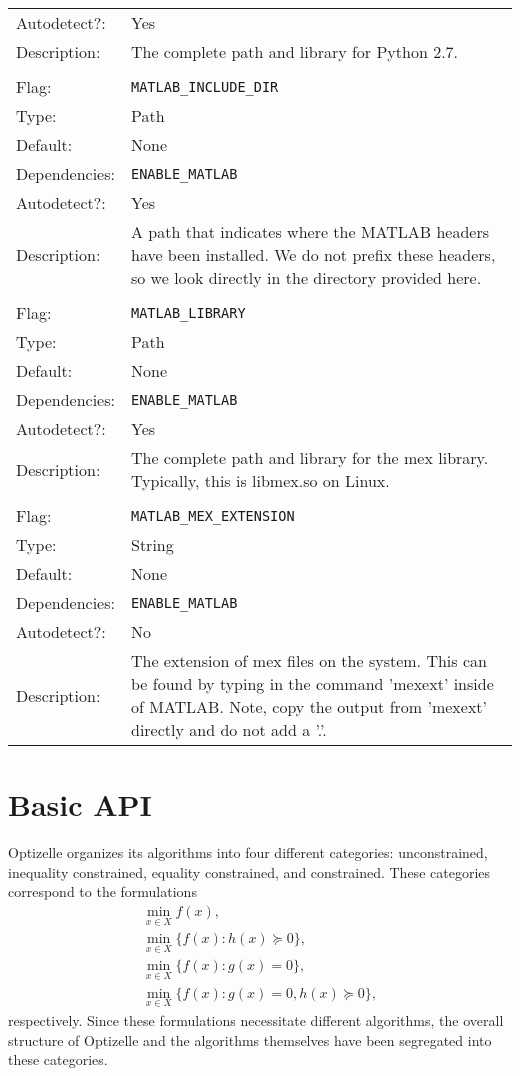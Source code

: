 \documentclass{report}
\begin{document}
\begin{center}
\begin{longtable}{p{}p{}}
Autodetect?:  &Yes \\
Description:  &The complete path and library for Python 2.7. \\
\\
Flag:         &\texttt{MATLAB\_INCLUDE\_DIR} \\
Type:         &Path \\
Default:      &None \\
Dependencies: &\texttt{ENABLE\_MATLAB}\\
Autodetect?:  &Yes \\
Description:  &A path that indicates where the MATLAB headers have been 
              installed.  We do not prefix these headers, so we look directly
              in the directory provided here.\\
\\
Flag:         &\texttt{MATLAB\_LIBRARY}\\
Type:         &Path \\
Default:      &None \\
Dependencies: &\texttt{ENABLE\_MATLAB}\\
Autodetect?:  &Yes \\
Description:  &The complete path and library for the mex library.  Typically,
              this is libmex.so on Linux.\\
\\
Flag:         &\texttt{MATLAB\_MEX\_EXTENSION}\\
Type:         &String \\
Default:      &None \\
Dependencies: &\texttt{ENABLE\_MATLAB}\\
Autodetect?:  &No \\
Description:  &The extension of mex files on the system.  This can be found
              by typing in the command 'mexext' inside of MATLAB.  Note, copy
              the output from 'mexext' directly and do not add a '.'.
\end{longtable}
\end{center}
       
\chapter{Basic API}\label{ch:Basic}

       Optizelle organizes its algorithms into four different categories: unconstrained, inequality constrained, equality constrained, and constrained.  These categories correspond to the formulations
$$\begin{array}{l}
    \min\limits_{x\in X} f(x),\\
    \min\limits_{x\in X} \{ f(x) : h(x)\succeq 0\},\\
    \min\limits_{x\in X} \{ f(x) : g(x)=0 \},\\
    \min\limits_{x\in X} \{ f(x) : g(x)=0, h(x)\succeq 0 \},
\end{array}$$
respectively.  Since these formulations necessitate different algorithms, the overall structure of Optizelle and the algorithms themselves have been segregated into these categories.
\end{document}
